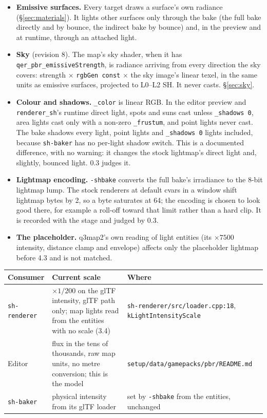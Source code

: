 \documentclass[11pt,a4paper]{article}
\begin{document}
\begin{itemize}
  marks it as standing in for an emissive surface; the preview and \texttt{renderer\_sh} treat it as
  an ordinary point or spot, and the bake ignores it, as it ignores \texttt{light\_area}.
\item \textbf{Emissive surfaces.} Every target draws a surface's own radiance (§\ref{sec:materials}).
  It lights other surfaces only through the bake (the full bake directly and by bounce, the
  indirect bake by bounce) and, in the preview and at runtime, through an attached light.
\item \textbf{Sky} (revision 8). The map's sky shader, when it has
  \texttt{qer\_pbr\_emissiveStrength}, is radiance arriving from every direction the sky covers:
  strength $\times$ \texttt{rgbGen const} $\times$ the sky image's linear texel, in the same units
  as emissive surfaces, projected to L0--L2 SH. It never casts. §\ref{sec:sky}.
\item \textbf{Colour and shadows.} \texttt{\_color} is linear RGB. In the editor preview and
  \texttt{renderer\_sh}'s runtime direct light, spots and suns cast unless \texttt{\_shadows 0},
  area lights cast only with a non-zero \texttt{\_frustum}, and point lights never cast. The bake shadows every light, point lights and \texttt{\_shadows 0}
  lights included, because \texttt{sh-baker} has no per-light shadow switch. This is a documented
  difference, with no warning: it changes the stock lightmap's direct light and, slightly, bounced
  light. 0.3 judges it.
\item \textbf{Lightmap encoding.} \texttt{-shbake} converts the full bake's irradiance to the 8-bit
  lightmap lump.
  The stock renderers at default cvars in a window shift lightmap bytes by 2, so a byte saturates
  at 64; the encoding is chosen to look good there, for example a roll-off toward that limit rather
  than a hard clip. It is recorded with the stage and judged by 0.3.
\item \textbf{The placeholder.} q3map2's own reading of light entities (its $\times 7500$
  intensity, distance clamp and envelope) affects only the placeholder lightmap before 4.3 and is
  not matched.
\end{itemize}

\begin{tabular}{@{}lp{}p{}@{}}
\toprule
Consumer & Current scale & Where \\
\midrule
\texttt{sh-renderer} & $\times 1/200$ on the glTF intensity, glTF path only; map lights read
  from the entities with no scale (3.4) &
  \texttt{sh-renderer/src/loader.cpp:18}, \texttt{kLightIntensityScale} \\
Editor & flux in the tens of thousands, raw map units, no metre conversion; this is the model &
  \texttt{setup/data/gamepacks/pbr/README.md} \\
\texttt{sh-baker} & physical intensity from its glTF loader & set by \texttt{-shbake} from the
  entities, unchanged \\
\bottomrule
\end{tabular}
\end{document}
